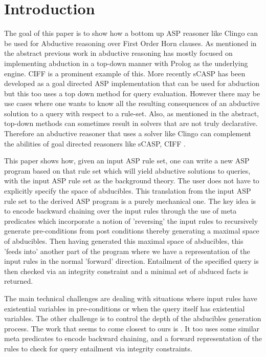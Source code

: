 \section{Introduction}\label{sec:introduction}

The goal of this paper is to show how a bottom up ASP reasoner like Clingo can be used for Abductive reasoning over First Order Horn clauses. As mentioned in the abstract previous work in abductive reasoning has mostly focused on implementing abduction in a top-down manner with Prolog as the underlying engine. CIFF \cite{mancarella09:_ciff} is a prominent example of this. More recently sCASP \cite{arias19:_const_answer_set_progr_groun_applic,arias_phd_2019} has been developed as a goal directed ASP implementation that can be used for abduction but this too uses a top down method for query evaluation. However there may be use cases where one wants to know all the resulting consequences of an abductive solution to a query with respect to a rule-set. Also, as mentioned in the abstract, top-down methods can sometimes result in solvers that are not truly declarative. Therefore an abductive reasoner that uses a solver like Clingo \cite{gebser12:_answer_set_solvin_pract} can
complement the abilities of goal directed reasoners like sCASP, CIFF \etc.

This paper shows how, given an input ASP rule set, one can write a new ASP program based on that rule set which will yield abductive solutions to queries, with the input ASP rule set as the background theory. The user does not have to explicitly specify the space of abducibles. This translation from the input ASP rule set to the derived ASP program is a purely mechanical one. The key idea is to encode backward chaining over the input rules through the use of meta predicates which incorporate a notion of 'reversing' the input rules to recursively generate pre-conditions from post conditions thereby generating a maximal space of abducibles. Then having generated this maximal space of abducibles, this 'feeds into' another part of the program where we have a representation of the input rules in the normal 'forward' direction. Entailment of the specified query is then checked via an integrity constraint and a minimal set of abduced facts is returned.

The main technical challenges are dealing with situations where input rules have existential variables in pre-conditions or when the query itself has existential variables. The other challenge is to control the depth of the abducibles generation process. The work that seems to come closest to ours is \cite{schueller16:_model_variat_first_order_horn}. It too uses some similar meta predicates to encode backward chaining, and a forward representation of the rules to check for query entailment via integrity constraints.

